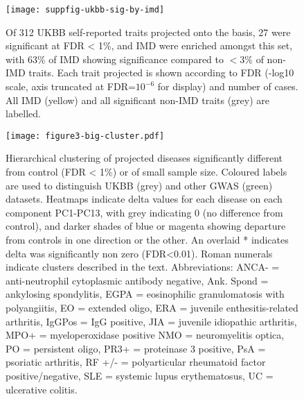 \documentclass[11pt]{article}
\begin{document}
\begin{figure}
  \centering
  \texttt{[image: suppfig-ukbb-sig-by-imd]}
  \caption{Of 312 UKBB self-reported traits projected onto the basis, 27 were significant at FDR < 1\%, and IMD were enriched amongst this set, with 63\% of IMD showing significance compared to $<3\%$ of non-IMD traits. Each trait projected is shown according to FDR (-log10 scale, axis  truncated at FDR=$10^{{-6}}$ for display) and number of cases.  All IMD (yellow) and all significant non-IMD traits (grey) are labelled.}
  \label{sfig:2}
\end{figure}

\begin{figure}
  \centering
  \texttt{[image: figure3-big-cluster.pdf]}
  \caption{Hierarchical clustering of projected diseases significantly different from control (FDR < 1\%) or of small sample size. Coloured labels are used to distinguish UKBB (grey) and other GWAS (green) datasets. Heatmaps indicate delta values for each disease on each component PC1-PC13, with grey indicating 0 (no difference from control), and darker shades of blue or magenta showing departure from controls in one direction or the other. An overlaid * indicates delta was significantly non zero (FDR<0.01). Roman numerals indicate clusters described in the text. Abbreviations: ANCA- = anti-neutrophil cytoplasmic antibody negative, Ank. Spond = ankylosing spondylitis, EGPA = eosinophilic granulomatosis with polyangiitis, EO = extended oligo, ERA = juvenile enthesitis-related arthritis, IgGPos = IgG positive, JIA = juvenile idiopathic arthritis, MPO+ = myeloperoxidase positive NMO = neuromyelitis optica, PO = persistent oligo, PR3+ = proteinase 3 positive, PsA = psoriatic arthritis, RF +/- = polyarticular rheumatoid factor positive/negative, SLE = systemic lupus erythematosus, UC = ulcerative colitis.}
  \label{fig:3}
\end{figure}
\end{document}
